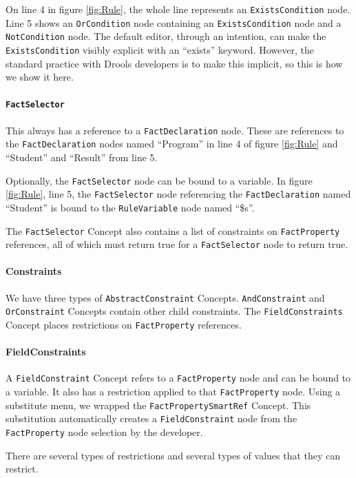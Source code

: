 On line 4 in figure \ref{fig:Rule}, the whole line represents an \texttt{ExistsCondition} node.
Line 5 shows an \texttt{OrCondition} node containing an \texttt{ExistsCondition} node and a \texttt{NotCondition} node.
The default editor, through an intention, can make the \texttt{ExistsCondition} visibly explicit with an ``exists'' keyword.
However, the standard practice with Drools developers is to make this implicit, so this is how we show it here.

\paragraph{\texttt{FactSelector}} This always has a reference to a \texttt{FactDeclaration} node.
These are references to the \texttt{FactDeclaration} nodes named ``Program'' in line 4 of figure \ref{fig:Rule} and ``Student'' and ``Result'' from line 5.

Optionally, the \texttt{FactSelector} node can be bound to a variable.
In figure \ref{fig:Rule}, line 5, the \texttt{FactSelector} node referencing the \texttt{FactDeclaration} named ``Student'' is bound to the \texttt{RuleVariable} node named ``\$s''.

The \texttt{FactSelector} Concept also contains a list of constraints on \texttt{FactProperty} references, all of which must return true for a \texttt{FactSelector} node to return true.

\paragraph{Constraints} We have three types of \texttt{AbstractConstraint} Concepts.
\texttt{AndConstraint} and \texttt{OrConstraint} Concepts contain other child constraints.
The \texttt{FieldConstraints} Concept places restrictions on \texttt{FactProperty} references.

\paragraph{FieldConstraints} A \texttt{FieldConstraint} Concept refers to a \texttt{FactProperty} node and can be bound to a variable.
It also has a restriction applied to that \texttt{FactProperty} node.
Using a substitute menu, we wrapped the \texttt{FactPropertySmartRef} Concept.
This substitution automatically creates a \texttt{FieldConstraint} node from the \texttt{FactProperty} node selection by the developer.

There are several types of restrictions and several types of values that they can restrict.


